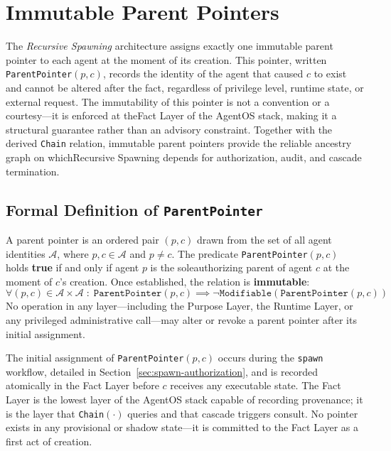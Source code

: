 \section{Immutable Parent Pointers}

The \emph{Recursive Spawning} architecture assigns exactly one immutable parent pointer to each agent at the moment of its creation. This pointer, written \texttt{ParentPointer}$(p, c)$, records the identity of the agent that caused $c$ to exist and cannot be altered after the fact, regardless of privilege level, runtime state, or external request. The immutability of this pointer is not a convention or a courtesy—it is enforced at theFact Layer of the AgentOS stack, making it a structural guarantee rather than an advisory constraint. Together with the derived \texttt{Chain} relation, immutable parent pointers provide the reliable ancestry graph on whichRecursive Spawning depends for authorization, audit, and cascade termination.

\subsection{Formal Definition of \texttt{ParentPointer}}

\begin{definition}
A parent pointer is an ordered pair $(p, c)$ drawn from the set of all agent identities $\mathcal{A}$, where $p, c \in \mathcal{A}$ and $p \neq c$. The predicate \texttt{ParentPointer}$(p, c)$ holds \textbf{true} if and only if agent $p$ is the soleauthorizing parent of agent $c$ at the moment of $c$'s creation. Once established, the relation is \textbf{immutable}:
\begin{equation}
\forall (p, c) \in \mathcal{A} \times \mathcal{A} \;:\; \texttt{ParentPointer}(p, c) \implies \neg \texttt{Modifiable}(\texttt{ParentPointer}(p, c))
\end{equation}
No operation in any layer—including the Purpose Layer, the Runtime Layer, or any privileged administrative call—may alter or revoke a parent pointer after its initial assignment.
\end{definition}

The initial assignment of \texttt{ParentPointer}$(p, c)$ occurs during the \texttt{spawn} workflow, detailed in Section~\ref{sec:spawn-authorization}, and is recorded atomically in the Fact Layer before $c$ receives any executable state. The Fact Layer is the lowest layer of the AgentOS stack capable of recording provenance; it is the layer that \texttt{Chain}$(\cdot)$ queries and that cascade triggers consult. No pointer exists in any provisional or shadow state—it is committed to the Fact Layer as a first act of creation.

